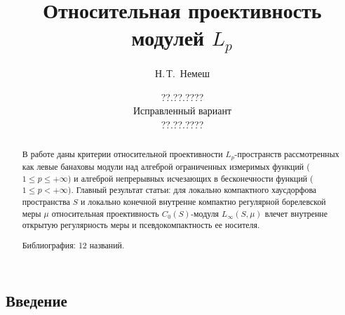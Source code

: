 \documentclass[12pt]{article}
\numberwithin{equation}{subsection}
\theoremstyle{plain}
\begin{document}

\date{??.??.????\\Исправленный вариант\\??.??.????}

\author{Н.\,Т.~Немеш}
\address{Московский государственный университет \\им. М. В. Ломоносова}

\title{Относительная проективность модулей $L_p$}

\maketitle

\begin{fulltext}
    \begin{abstract}

        В работе даны критерии относительной проективности $L_p$-про\-странств
        рассмотренных как левые банаховы модули над алгеброй ограниченных
        измеримых функций ($1\leq p\leq+\infty$) и алгеброй непрерывных
        исчезающих в бесконечности функций ($1\leq p <+\infty$). Главный
        результат статьи: для локально компактного хаусдорфова пространства $S$
        и локально конечной внутренне компактно регулярной борелевской меры
        $\mu$ относительная проективность $C_0(S)$-модуля $L_\infty(S,\mu)$
        влечет внутренне открытую регулярность меры и псевдокомпактность ее
        носителя.

        Библиография: 12 названий.
    \end{abstract}




    \section{Введение}\label{SectionIntroduction}


\end{fulltext}
\end{document}
